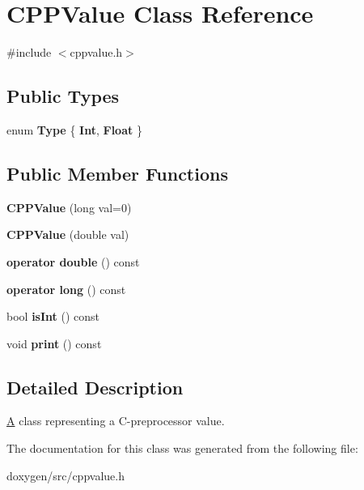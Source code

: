 \hypertarget{class_c_p_p_value}{}\section{C\+P\+P\+Value Class Reference}
\label{class_c_p_p_value}


{\ttfamily \#include $<$cppvalue.\+h$>$}

\subsection*{Public Types}
\begin{DoxyCompactItemize}
\item 
\mbox{\label{class_c_p_p_value_a0a0e186bfc7d4ec0bb75f2c502a6eb34}} 
enum {\bfseries Type} \{ {\bfseries Int}, 
{\bfseries Float}
 \}
\end{DoxyCompactItemize}
\subsection*{Public Member Functions}
\begin{DoxyCompactItemize}
\item 
\mbox{\label{class_c_p_p_value_ae973cc2789cb6245795c2e1887b658ab}} 
{\bfseries C\+P\+P\+Value} (long val=0)
\item 
\mbox{\label{class_c_p_p_value_aa0f3cec447b7915d5d664f15bc90a281}} 
{\bfseries C\+P\+P\+Value} (double val)
\item 
\mbox{\label{class_c_p_p_value_af9a9e3f92e4cb30ace5ef213b4e51206}} 
{\bfseries operator double} () const
\item 
\mbox{\label{class_c_p_p_value_a1e1cc4b52b50721ca6761350238b9149}} 
{\bfseries operator long} () const
\item 
\mbox{\label{class_c_p_p_value_a7aa33d6475560d173b112a121809062a}} 
bool {\bfseries is\+Int} () const
\item 
\mbox{\label{class_c_p_p_value_a5a6a6e41b8b27935b625082184af681c}} 
void {\bfseries print} () const
\end{DoxyCompactItemize}


\subsection{Detailed Description}
\mbox{\hyperlink{class_a}{A}} class representing a C-\/preprocessor value. 

The documentation for this class was generated from the following file\+:\begin{DoxyCompactItemize}
\item 
doxygen/src/cppvalue.\+h\end{DoxyCompactItemize}

